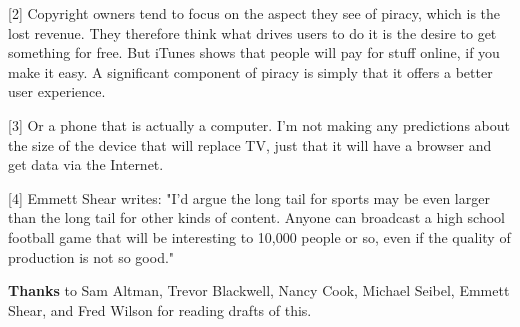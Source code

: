 [2] Copyright owners tend to focus on the aspect they see of
                  piracy, which is the lost revenue. They therefore think what
                  drives users to do it is the desire to get something for free.
                  But iTunes shows that people will pay for stuff online, if you
                  make it easy. A significant component of piracy is simply that
                  it offers a better user experience.

[3] Or a phone that is actually a computer. I'm not making any
                  predictions about the size of the device that will replace TV,
                  just that it will have a browser and get data via the
                  Internet.

[4] Emmett Shear writes: "I'd argue the long tail for sports
                  may be even larger than the long tail for other kinds of
                  content. Anyone can broadcast a high school football game that
                  will be interesting to 10,000 people or so, even if the
                  quality of production is not so good."


                  \textbf{Thanks} to Sam Altman, Trevor Blackwell, Nancy Cook,
                  Michael Seibel, Emmett Shear, and Fred Wilson for reading
                  drafts of this.


              
            
          
